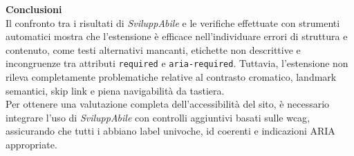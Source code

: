 \noindent \textbf{Conclusioni}\\
Il confronto tra i risultati di \textit{SviluppAbile} e le verifiche effettuate con strumenti automatici mostra che l’estensione è efficace nell’individuare errori di struttura e contenuto, come testi alternativi mancanti, etichette non descrittive e incongruenze tra attributi \texttt{required} e \texttt{aria-required}. Tuttavia, l’estensione non rileva completamente problematiche relative al contrasto cromatico, landmark semantici, skip link e piena navigabilità da tastiera.\\
Per ottenere una valutazione completa dell’accessibilità del sito, è necessario integrare l’uso di \textit{SviluppAbile} con controlli aggiuntivi basati sulle \acrshort{wcag}, assicurando che tutti i  abbiano label univoche, id coerenti e indicazioni ARIA appropriate.


